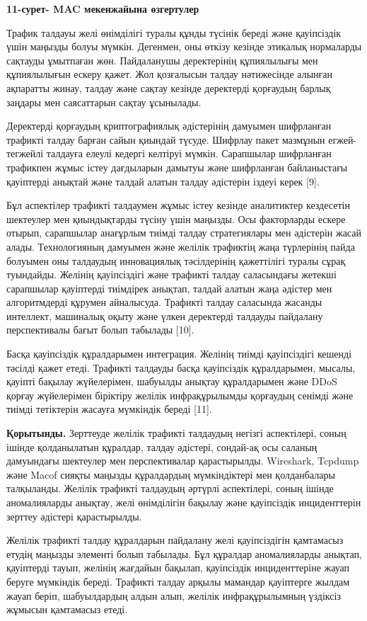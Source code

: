 \textbf{11-сурет- MAC мекенжайына өзгертулер}

Трафик талдауы желі өнімділігі туралы құнды түсінік береді және
қауіпсіздік үшін маңызды болуы мүмкін. Дегенмен, оны өткізу кезінде
этикалық нормаларды сақтауды ұмытпаған жөн. Пайдаланушы деректерінің
құпиялылығы мен құпиялылығын ескеру қажет. Жол қозғалысын талдау
нәтижесінде алынған ақпаратты жинау, талдау және сақтау кезінде
деректерді қорғаудың барлық заңдары мен саясаттарын сақтау ұсынылады.

Деректерді қорғаудың криптографиялық әдістерінің дамуымен шифрланған
трафикті талдау барған сайын қиындай түсуде. Шифрлау пакет мазмұнын
егжей-тегжейлі талдауға елеулі кедергі келтіруі мүмкін. Сарапшылар
шифрланған трафикпен жұмыс істеу дағдыларын дамытуы және шифрланған
байланыстағы қауіптерді анықтай және талдай алатын талдау әдістерін
іздеуі керек {[}9{]}.

Бұл аспектілер трафикті талдаумен жұмыс істеу кезінде аналитиктер
кездесетін шектеулер мен қиындықтарды түсіну үшін маңызды. Осы
факторларды ескере отырып, сарапшылар анағұрлым тиімді талдау
стратегиялары мен әдістерін жасай алады. Технологияның дамуымен және
желілік трафиктің жаңа түрлерінің пайда болуымен оны талдаудың
инновациялық тәсілдерінің қажеттілігі туралы сұрақ туындайды. Желінің
қауіпсіздігі және трафикті талдау саласындағы жетекші сарапшылар
қауіптерді тиімдірек анықтап, талдай алатын жаңа әдістер мен
алгоритмдерді құрумен айналысуда. Трафикті талдау саласында жасанды
интеллект, машиналық оқыту және үлкен деректерді талдауды пайдалану
перспективалы бағыт болып табылады {[}10{]}.

Басқа қауіпсіздік құралдарымен интеграция. Желінің тиімді қауіпсіздігі
кешенді тәсілді қажет етеді. Трафикті талдауды басқа қауіпсіздік
құралдарымен, мысалы, қауіпті бақылау жүйелерімен, шабуылды анықтау
құралдарымен және DDoS қорғау жүйелерімен біріктіру желілік
инфрақұрылымды қорғаудың сенімді және тиімді тетіктерін жасауға
мүмкіндік береді {[}11{]}.

\textbf{Қорытынды.} Зерттеуде желілік трафикті талдаудың негізгі
аспектілері, соның ішінде қолданылатын құралдар, талдау әдістері,
сондай-ақ осы саланың дамуындағы шектеулер мен перспективалар
қарастырылды. Wireshark, Tcpdump және Macof сияқты маңызды құралдардың
мүмкіндіктері мен қолданбалары талқыланды. Желілік трафикті талдаудың
әртүрлі аспектілері, соның ішінде аномалияларды анықтау, желі
өнімділігін бақылау және қауіпсіздік инциденттерін зерттеу әдістері
қарастырылды.

Желілік трафикті талдау құралдарын пайдалану желі қауіпсіздігін
қамтамасыз етудің маңызды элементі болып табылады. Бұл құралдар
аномалияларды анықтап, қауіптерді тауып, желінің жағдайын бақылап,
қауіпсіздік инциденттеріне жауап беруге мүмкіндік береді. Трафикті
талдау арқылы мамандар қауіптерге жылдам жауап беріп, шабуылдардың алдын
алып, желілік инфрақұрылымның үздіксіз жұмысын қамтамасыз етеді.

